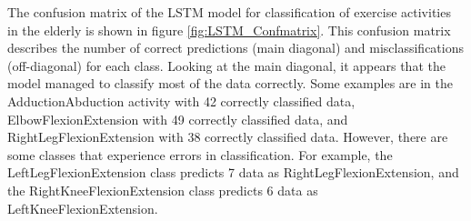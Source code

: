 The confusion matrix of the LSTM model for classification of exercise activities in the elderly is shown in figure \ref{fig:LSTM_Confmatrix}. This confusion matrix describes the number of correct predictions (main diagonal) and misclassifications (off-diagonal) for each class. Looking at the main diagonal, it appears that the model managed to classify most of the data correctly. Some examples are in the AdductionAbduction activity with 42 correctly classified data, ElbowFlexionExtension with 49 correctly classified data, and RightLegFlexionExtension with 38 correctly classified data. However, there are some classes that experience errors in classification. For example, the LeftLegFlexionExtension class predicts 7 data as RightLegFlexionExtension, and the RightKneeFlexionExtension class predicts 6 data as LeftKneeFlexionExtension.

